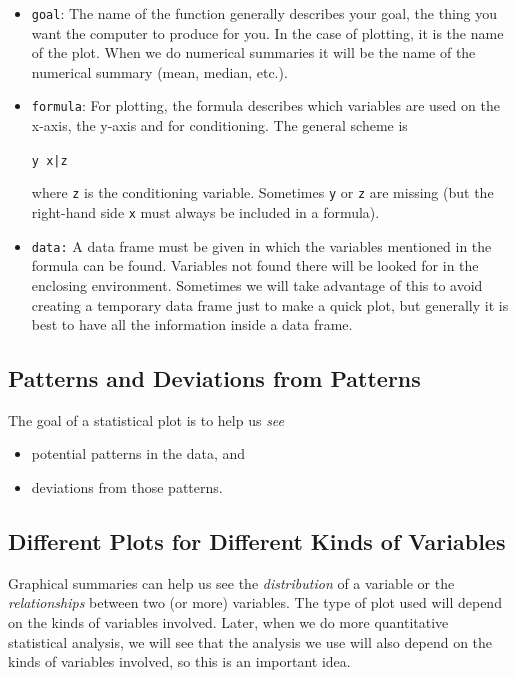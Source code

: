 \documentclass[twoside]{book}\usepackage[]{graphicx}\usepackage[]{xcolor}
\makeatletter
\newcommand{\hlopt}[1]{\textcolor[rgb]{0,0,0}{#1}}%
\newcommand{\hlstd}[1]{\textcolor[rgb]{0.345,0.345,0.345}{#1}}%
\newenvironment{kframe}{%
 \def\at@end@of@kframe{}%
 \ifinner\ifhmode%
  \def\at@end@of@kframe{\end{minipage}}%
  \begin{minipage}{\columnwidth}%
 \fi\fi%
 \def\FrameCommand##1{\hskip\@totalleftmargin \hskip-\fboxsep
 \colorbox{shadecolor}{##1}\hskip-\fboxsep
     \hskip-\linewidth \hskip-\@totalleftmargin \hskip\columnwidth}%
 \MakeFramed {\advance\hsize-\width
   \@totalleftmargin\z@ \linewidth\hsize
   \@setminipage}}%
 {\par\unskip\endMakeFramed%
 \at@end@of@kframe}
\newenvironment{knitrout}{}{} %
\makeatother
\begin{document}
\begin{itemize}
	\item \texttt{goal}: The name of the function generally describes your goal, 
		the thing you want the computer to produce for you.  In the case of plotting,
		it is the name of the plot.  When we do numerical summaries it will be the 
		name of the numerical summary (mean, median, etc.).
	\item
		\texttt{formula}: For plotting, the formula describes which variables are 
		used on the x-axis, the y-axis and for conditioning.  The general scheme is
\begin{knitrout}
\color{fgcolor}\begin{kframe}
\begin{alltt}
\hlstd{y} \hlopt{~} \hlstd{x} \hlopt{|} \hlstd{z}
\end{alltt}
\end{kframe}
\end{knitrout}
		where \texttt{z} is the conditioning variable.  Sometimes \texttt{y} or \texttt{z} 
		are missing (but the right-hand side \texttt{x} must always be included in a formula).
	\item
		\texttt{data:} A data frame must be given in which the variables mentioned in
		the formula can be found.  Variables not found there will be looked for in the 
		enclosing environment.  Sometimes we will take advantage of this to avoid creating
		a temporary data frame just to make a quick plot, but generally it is best to have
		all the information inside a data frame.
\end{itemize}

\subsection{Patterns and Deviations from Patterns}
The goal of a statistical plot is to help us \emph{see} 
\begin{itemize}
\item 
potential patterns in the data, and 
\item
deviations from those patterns.  
\end{itemize}

\subsection{Different Plots for Different Kinds of Variables}
Graphical summaries can help us see the \emph{distribution} of a variable 
or the \emph{relationships} between two (or more) variables.  The type of plot
used will depend on the kinds of variables involved. Later, when we do more quantitative 
statistical analysis, we will see that the analysis we use will 
also depend on the kinds of variables involved, so this is an important idea.
\end{document}

